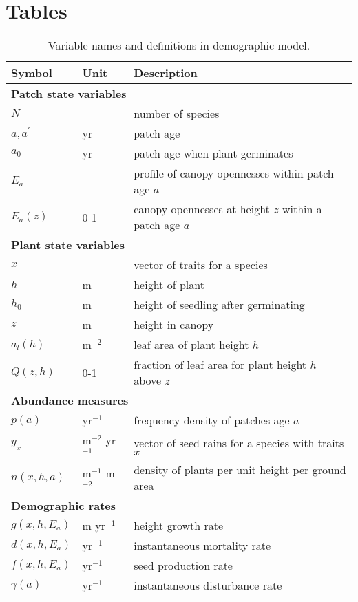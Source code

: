 \documentclass[10pt,twoside]{article}
\begin{document}
\section{Tables}\label{tables}

\begin{table}[ht]
 \caption{Variable names and definitions in demographic model.}
\centering
  \begin{tabular}{p{2cm}p{2cm}p{9cm}}
  \hline
  Symbol & Unit & Description \\
  \hline
  \multicolumn{3}{l}{\textbf{Patch state variables}} \\
  $N$   & & number of species \\
  $a, a^{\prime}$ & yr & patch age \\
  $a_0$ & yr & patch age when plant germinates \\
  $E_a$ & & profile of canopy opennesses within patch age $a$\\
  $E_a(z)$& 0-1 & canopy opennesses at height $z$ within a patch age $a$\\

  \multicolumn{3}{l}{\textbf{Plant state variables}} \\
  $x$   & & vector of traits for a species\\
  $h$   & m & height of plant\\
  $h_0$   & m  & height of seedling after germinating\\
  $z$   & m & height in canopy\\
  $a_l(h)$  & m$^{-2}$ & leaf area of plant height $h$ \\
  $Q(z, h)$ & 0-1 & fraction of leaf area for plant height $h$ above $z$\\
 
  \multicolumn{3}{l}{\textbf{Abundance measures}} \\
  $p(a)$ & yr$^{-1}$ & frequency-density of patches age $a$ \\
  $y_x$ & m$^{-2}$ yr$^{-1}$ & vector of seed rains for a species with traits $x$\\
  $n(x,h,a)$ & m$^{-1}$ m$^{-2}$ & density of plants per unit height per ground area\\

  \multicolumn{3}{l}{\textbf{Demographic rates}} \\
  $g(x,h, E_a)$ & m yr$^{-1}$ & height growth rate \\
  $d(x,h, E_a)$ & yr$^{-1}$ & instantaneous mortality rate \\
  $f(x,h, E_a)$ & yr$^{-1}$ & seed production rate \\
  $\gamma(a)$ & yr$^{-1}$ & instantaneous disturbance rate\\


\end{tabular}
\end{table}
\end{document}
